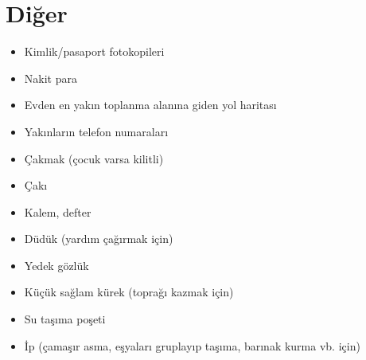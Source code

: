 \chapter*{Diğer}

\begin{itemize}
	\item Kimlik/pasaport fotokopileri
	\item Nakit para
	\item Evden en yakın toplanma alanına giden yol haritası
	\item Yakınların telefon numaraları
	\item Çakmak (çocuk varsa kilitli)
	\item Çakı
	\item Kalem, defter
	\item Düdük (yardım çağırmak için)
	\item Yedek gözlük
	\item Küçük sağlam kürek (toprağı kazmak için)
	\item Su taşıma poşeti
	\item İp (çamaşır asma, eşyaları gruplayıp taşıma, barınak kurma vb. için)
\end{itemize}